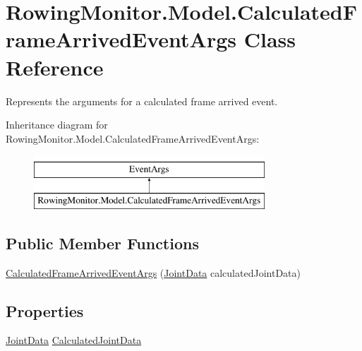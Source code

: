 \hypertarget{class_rowing_monitor_1_1_model_1_1_calculated_frame_arrived_event_args}{}\section{Rowing\+Monitor.\+Model.\+Calculated\+Frame\+Arrived\+Event\+Args Class Reference}
\label{class_rowing_monitor_1_1_model_1_1_calculated_frame_arrived_event_args}


Represents the arguments for a calculated frame arrived event.  


Inheritance diagram for Rowing\+Monitor.\+Model.\+Calculated\+Frame\+Arrived\+Event\+Args\+:\begin{figure}[H]
\begin{center}
\leavevmode
\includegraphics[height=2.000000cm]{class_rowing_monitor_1_1_model_1_1_calculated_frame_arrived_event_args}
\end{center}
\end{figure}
\subsection*{Public Member Functions}
\begin{DoxyCompactItemize}
\item 
\hyperlink{class_rowing_monitor_1_1_model_1_1_calculated_frame_arrived_event_args_ab73cb44f37b699c76ed2a5b1d98338d3}{Calculated\+Frame\+Arrived\+Event\+Args} (\hyperlink{struct_rowing_monitor_1_1_model_1_1_util_1_1_joint_data}{Joint\+Data} calculated\+Joint\+Data)
\end{DoxyCompactItemize}
\subsection*{Properties}
\begin{DoxyCompactItemize}
\item 
\hyperlink{struct_rowing_monitor_1_1_model_1_1_util_1_1_joint_data}{Joint\+Data} \hyperlink{class_rowing_monitor_1_1_model_1_1_calculated_frame_arrived_event_args_ad2a6d96247f32cec46b5e5006b4a867b}{Calculated\+Joint\+Data}
\end{DoxyCompactItemize}


